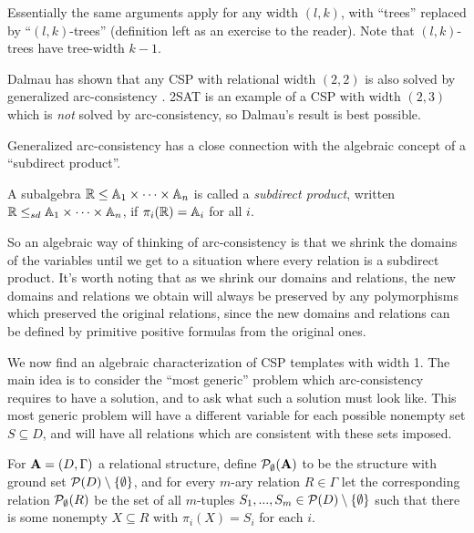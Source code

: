 \documentclass[letterpaper,11pt]{article}
\begin{document}
\begin{rem} Essentially the same arguments apply for any width $(l,k)$, with ``trees'' replaced by ``$(l,k)$-trees'' (definition left as an exercise to the reader). Note that $(l,k)$-trees have tree-width $k-1$. 
\end{rem}

\begin{rem} Dalmau has shown that any CSP with relational width $(2,2)$ is also solved by generalized arc-consistency \cite{no-pure-width-2}. 2SAT is an example of a CSP with width $(2,3)$ which is \emph{not} solved by arc-consistency, so Dalmau's result is best possible.
\end{rem}

Generalized arc-consistency has a close connection with the algebraic concept of a ``subdirect product''.

\begin{defn} A subalgebra $\mathbb{R}\le \mathbb{A}_1\times \cdots \times \mathbb{A}_n$ is called a \emph{subdirect product}, written $\mathbb{R} \le_{sd} \mathbb{A}_1\times \cdots \times \mathbb{A}_n$, if $\pi_i(\mathbb{R}) = \mathbb{A}_i$ for all $i$.
\end{defn}

So an algebraic way of thinking of arc-consistency is that we shrink the domains of the variables until we get to a situation where every relation is a subdirect product. It's worth noting that as we shrink our domains and relations, the new domains and relations we obtain will always be preserved by any polymorphisms which preserved the original relations, since the new domains and relations can be defined by primitive positive formulas from the original ones.

We now find an algebraic characterization of CSP templates with width 1. The main idea is to consider the ``most generic'' problem which arc-consistency requires to have a solution, and to ask what such a solution must look like. This most generic problem will have a different variable for each possible nonempty set $S \subseteq D$, and will have all relations which are consistent with these sets imposed.

\begin{defn} For $\mathbf{A} = (D, \Gamma)$ a relational structure, define $\mathcal{P}_\emptyset(\mathbf{A})$ to be the structure with ground set $\mathcal{P}(D)\setminus \{\emptyset\}$, and for every $m$-ary relation $R \in \Gamma$ let the corresponding relation $\mathcal{P}_\emptyset(R)$ be the set of all $m$-tuples $S_1, ..., S_m \in \mathcal{P}(D)\setminus \{\emptyset\}$ such that there is some nonempty $X \subseteq R$ with $\pi_i(X) = S_i$ for each $i$.
\end{defn}
\end{document}
